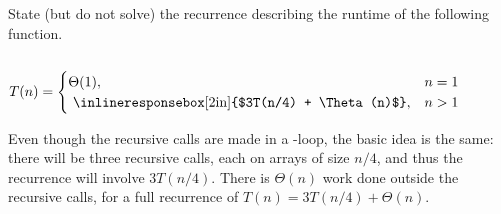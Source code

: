 \begin{prob}
    State (but do not solve) the recurrence describing the runtime of the following function.

    \inputminted{python}{\thisdir/code.py}

    \vspace{1em}

    $
        T(n) = \begin{cases}
            \Theta(1), & n = 1\\
            \text{
                \inlineresponsebox[2in]{$3T(n/4) + \Theta(n)$}%
            }, & n > 1
        \end{cases}
    $

    \begin{soln}
        Even though the recursive calls are made in a -loop, the
        basic idea is the same: there will be three recursive calls, each on
        arrays of size $n/4$, and thus the recurrence will involve $3 T(n/4)$.
        There is $\Theta(n)$ work done outside the recursive calls, for a full
        recurrence of $T(n) = 3 T(n/4) + \Theta(n)$.
    \end{soln}

\end{prob}

